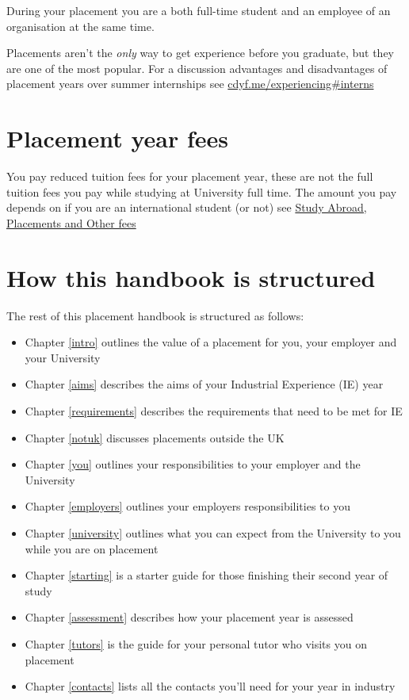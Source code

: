\documentclass[
]{book}
\providecommand{\tightlist}{%
  \setlength{\itemsep}{0pt}\setlength{\parskip}{0pt}}
\begin{document}
During your placement you are a both full-time student and an employee of an organisation at the same time.

Placements aren't the \emph{only} way to get experience before you graduate, but they are one of the most popular. For a discussion advantages and disadvantages of placement years over summer internships see \href{https://www.cdyf.me/experiencing\#interns}{cdyf.me/experiencing\#interns} \citep{experiencing}

\section{Placement year fees}\label{fees}

You pay reduced tuition fees for your placement year, these are not the full tuition fees you pay while studying at University full time. The amount you pay depends on if you are an international student (or not) see \href{https://www.studentsupport.manchester.ac.uk/finances/tuition-fees/fee-amounts/other-fees/}{Study Abroad, Placements and Other fees} \citep{fees}

\section{How this handbook is structured}\label{guide}

The rest of this placement handbook is structured as follows:

\begin{itemize}
\tightlist
\item
  Chapter \ref{intro} outlines the value of a placement for you, your employer and your University
\item
  Chapter \ref{aims} describes the aims of your Industrial Experience (IE) year
\item
  Chapter \ref{requirements} describes the requirements that need to be met for IE
\item
  Chapter \ref{notuk} discusses placements outside the UK
\item
  Chapter \ref{you} outlines your responsibilities to your employer and the University
\item
  Chapter \ref{employers} outlines your employers responsibilities to you
\item
  Chapter \ref{university} outlines what you can expect from the University to you while you are on placement
\item
  Chapter \ref{starting} is a starter guide for those finishing their second year of study
\item
  Chapter \ref{assessment} describes how your placement year is assessed
\item
  Chapter \ref{tutors} is the guide for your personal tutor who visits you on placement
\item
  Chapter \ref{contacts} lists all the contacts you'll need for your year in industry
\end{itemize}
\end{document}
